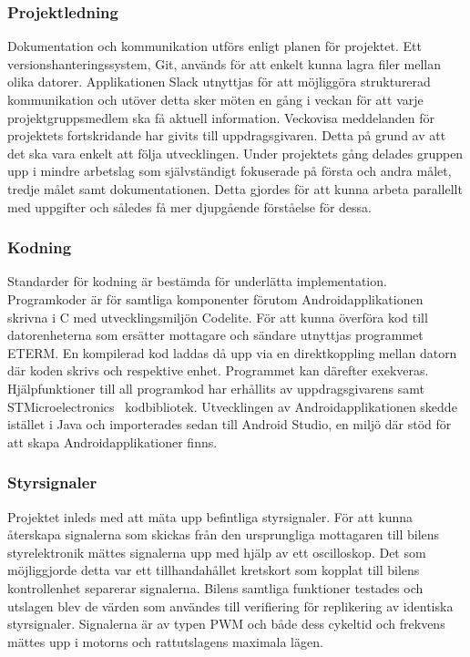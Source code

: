 \documentclass[a4paper]{article}
\begin{document}
\subsubsection{Projektledning}
Dokumentation och kommunikation utförs enligt planen för projektet. Ett versionshanteringssystem, Git, används för att enkelt kunna lagra filer mellan olika datorer. Applikationen Slack utnyttjas för att möjliggöra strukturerad kommunikation och utöver detta sker möten en gång i veckan för att varje projektgruppsmedlem ska få aktuell information. Veckovisa meddelanden för projektets fortskridande har givits till uppdragsgivaren. Detta på grund av att det ska vara enkelt att följa utvecklingen. Under projektets gång delades gruppen upp i mindre arbetslag som självständigt fokuserade på första och andra målet, tredje målet samt dokumentationen. Detta gjordes för att kunna arbeta parallellt med uppgifter och således få mer djupgående förståelse för dessa.

\subsubsection{Kodning}
Standarder för kodning är bestämda för underlätta implementation. Programkoder är för samtliga komponenter förutom Androidapplikationen skrivna i C med utvecklingsmiljön Codelite. För att kunna överföra kod till datorenheterna som ersätter mottagare och sändare utnyttjas programmet ETERM. En kompilerad kod laddas då upp via en direktkoppling mellan datorn där koden skrivs och respektive enhet. Programmet kan därefter exekveras. Hjälpfunktioner till all programkod har erhållits av uppdragsgivarens samt STMicroelectronics~\cite{STM} kodbibliotek. Utvecklingen av Androidapplikationen skedde istället i Java och importerades sedan till Android Studio, en miljö där stöd för att skapa Androidapplikationer finns.

\subsubsection{Styrsignaler}
Projektet inleds med att mäta upp befintliga styrsignaler. För att kunna återskapa signalerna som skickas från den ursprungliga mottagaren till bilens styrelektronik mättes signalerna upp med hjälp av ett oscilloskop. Det som möjliggjorde detta var ett tillhandahållet kretskort som kopplat till bilens kontrollenhet separerar signalerna. Bilens samtliga funktioner testades och utslagen blev de värden som användes till verifiering för replikering av identiska styrsignaler. Signalerna är av typen PWM och både dess cykeltid och frekvens mättes upp i motorns och rattutslagens maximala lägen. 
\end{document}
